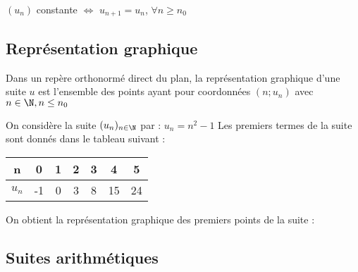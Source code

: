 \documentclass[11pt]{article}
\begin{document}
\begin{definition}
$(u_n)$ constante $\iff$ $u_{n+1}
= u_n$, $\forall n \ge n_0$
\end{definition}

\subsection{Représentation graphique}

\begin{definition}
Dans un repère orthonormé direct du plan, la représentation graphique
d'une suite $u$ est l'ensemble des points ayant pour coordonnées
$(n;u_n)$ avec $n \in \N, n \leq n_0$ 
\end{definition}

\begin{exemple}
On considère la suite $(u_n)_{n\in\N}$ par : $u_n = n^2 - 1$  
Les premiers termes de la suite sont donnés dans le tableau suivant :
\begin{center}
\begin{tabular}{|c|c|c|c|c|c|c|}
\hline
\textbf{n} & 0 & 1 & 2 & 3 & 4 & 5 \\ \hline
\textbf{$u_n$} & -1 & 0 & 3 & 8 & 15 & 24 \\ \hline
\end{tabular}
\end{center}
On obtient la représentation graphique des premiers points de la suite
:
\begin{center}
\end{center}
\end{exemple}

\subsection{Suites arithmétiques}
\end{document}
